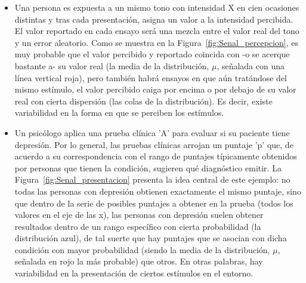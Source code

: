 \begin{itemize}
	\item Una persona es expuesta a un mismo tono con intensidad X en cien ocasiones distintas y tras cada presentación, asigna un valor a la intensidad percibida. El valor reportado en cada ensayo será una mezcla entre el valor real del tono y un error aleatorio. Como se muestra en la Figura~\ref{fig:Senal_percepcion}, es muy probable que el valor percibido y reportado coincida con -o se acerque bastante a- su valor real (la media de la distribución, $\mu$, señalada con una línea vertical roja), pero también habrá ensayos en que aún tratándose del mismo estímulo, el valor percibido caiga por encima o por debajo de su valor real con cierta dispersión (las colas de la distribución). Es decir, existe variabilidad en la forma en que se perciben los estímulos.\\

	\item Un psicólogo aplica una prueba clínica 'A' para evaluar si su paciente tiene depresión. Por lo general, las pruebas clínicas arrojan un puntaje 'p' que, de acuerdo a su correspondencia con el rango de puntajes típicamente obtenidos por personas que tienen la condición, sugieren qué diagnóstico emitir. La Figura~\ref{fig:Senal_presentacion} presenta la idea central de este ejemplo: no todas las personas con depresión obtienen exactamente el mismo puntaje, sino que dentro de la serie de posibles puntajes a obtener en la prueba (todos los valores en el eje de las x), las personas con depresión suelen obtener resultados dentro de un rango específico con cierta probabilidad (la distribución azul), de tal suerte que hay puntajes que se asocian con dicha condición con mayor probabilidad (siendo la media de la distribución, $\mu$, señalada en rojo la más probable) que otros. En otras palabras, hay variabilidad en la presentación de ciertos estímulos en el entorno.\\
\end{itemize}

